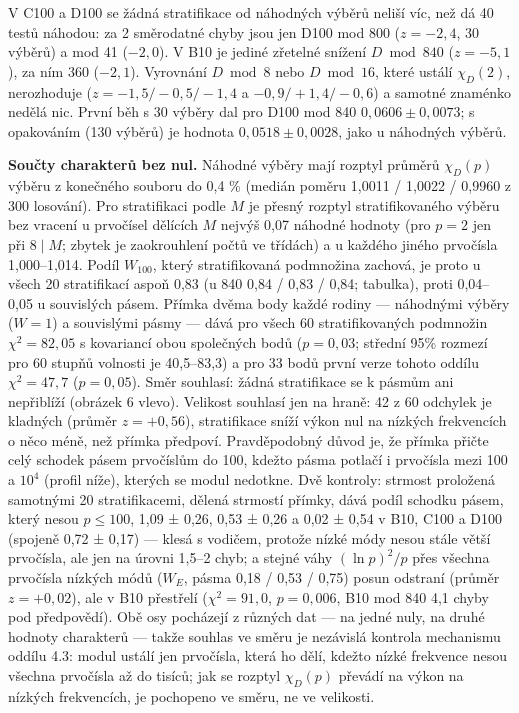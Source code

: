 \documentclass[
  10pt,
]{article}
\begin{document}
V C100 a D100 se žádná stratifikace od náhodných výběrů neliší víc, než
dá 40 testů náhodou: za 2 směrodatné chyby jsou jen D100 mod 800
(\(z = -2{,}4\), 30 výběrů) a mod 41 (\(-2{,}0\)). V B10 je jediné
zřetelné snížení \(D \bmod 840\) (\(z = -5{,}1\)), za ním 360
(\(-2{,}1\)). Vyrovnání \(D \bmod 8\) nebo \(D \bmod 16\), které ustálí
\(\chi_D(2)\), nerozhoduje (\(z = -1{,}5 / -0{,}5 / -1{,}4\) a
\(-0{,}9 / +1{,}4 / -0{,}6\)) a samotné znaménko nedělá nic. První běh s
30 výběry dal pro D100 mod 840 \(0{,}0606 \pm 0{,}0073\); s opakováním
(130 výběrů) je hodnota \(0{,}0518 \pm 0{,}0028\), jako u náhodných
výběrů.

\textbf{Součty charakterů bez nul.} Náhodné výběry mají rozptyl průměrů
\(\chi_D(p)\) výběru z konečného souboru do 0,4 \% (medián poměru 1,0011
/ 1,0022 / 0,9960 z 300 losování). Pro stratifikaci podle \(M\) je
přesný rozptyl stratifikovaného výběru bez vracení u prvočísel dělících
\(M\) nejvýš 0,07 náhodné hodnoty (pro \(p = 2\) jen při \(8 \mid M\);
zbytek je zaokrouhlení počtů ve třídách) a u každého jiného prvočísla
1,000--1,014. Podíl \(W_{100}\), který stratifikovaná podmnožina
zachová, je proto u všech 20 stratifikací aspoň 0,83 (u 840 0,84 / 0,83
/ 0,84; tabulka), proti 0,04--0,05 u souvislých pásem. Přímka dvěma body
každé rodiny --- náhodnými výběry (\(W = 1\)) a souvislými pásmy ---
dává pro všech 60 stratifikovaných podmnožin \(\chi^2 = 82{,}05\) s
kovariancí obou společných bodů (\(p = 0{,}03\); střední 95\% rozmezí
pro 60 stupňů volnosti je 40,5--83,3) a pro 33 bodů první verze tohoto
oddílu \(\chi^2 = 47{,}7\) (\(p = 0{,}05\)). Směr souhlasí: žádná
stratifikace se k pásmům ani nepřiblíží (obrázek 6 vlevo). Velikost
souhlasí jen na hraně: 42 z 60 odchylek je kladných (průměr
\(z = +0{,}56\)), stratifikace sníží výkon nul na nízkých frekvencích o
něco méně, než přímka předpoví. Pravděpodobný důvod je, že přímka přičte
celý schodek pásem prvočíslům do 100, kdežto pásma potlačí i prvočísla
mezi 100 a \(10^4\) (profil níže), kterých se modul nedotkne. Dvě
kontroly: strmost proložená samotnými 20 stratifikacemi, dělená strmostí
přímky, dává podíl schodku pásem, který nesou \(p \le 100\), 1,09 ±
0,26, 0,53 ± 0,26 a 0,02 ± 0,54 v B10, C100 a D100 (spojeně 0,72 ± 0,17)
--- klesá s vodičem, protože nízké módy nesou stále větší prvočísla, ale
jen na úrovni 1,5--2 chyb; a stejné váhy \((\ln p)^2/p\) přes všechna
prvočísla nízkých módů (\(W_E\), pásma 0,18 / 0,53 / 0,75) posun
odstraní (průměr \(z = +0{,}02\)), ale v B10 přestřelí
(\(\chi^2 = 91{,}0\), \(p = 0{,}006\), B10 mod 840 4,1 chyby pod
předpovědí). Obě osy pocházejí z různých dat --- na jedné nuly, na druhé
hodnoty charakterů --- takže souhlas ve směru je nezávislá kontrola
mechanismu oddílu 4.3: modul ustálí jen prvočísla, která ho dělí, kdežto
nízké frekvence nesou všechna prvočísla až do tisíců; jak se rozptyl
\(\chi_D(p)\) převádí na výkon na nízkých frekvencích, je pochopeno ve
směru, ne ve velikosti.
\end{document}
